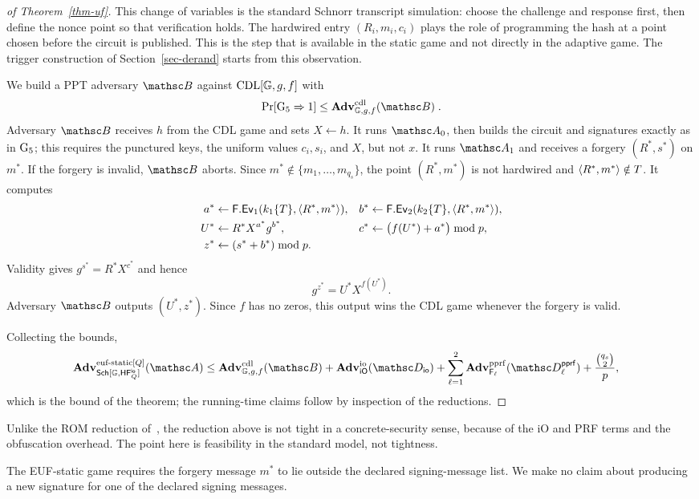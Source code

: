\begin{proof}[of Theorem~\ref{thm-uf}]
This change of variables is the standard Schnorr transcript simulation: choose the challenge and response first, then define the nonce point so that verification holds. The hardwired entry $(R_i,m_i,c_i)$ plays the role of programming the hash at a point chosen before the circuit is published. This is the step that is available in the static game and not directly in the adaptive game. The trigger construction of Section~\ref{sec-derand} starts from this observation.

 We build a PPT adversary $\advB$ against $\text{CDL}[\mathbb{G},g,f]$ with
$$\Pr[\Gm_5 \Rightarrow 1] \le \AdvCDL{\GG,g,f}{\advB} \;.$$
Adversary $\advB$ receives $h$ from the CDL game and sets $X\gets h$. It runs $\advA_0$, then builds the circuit and signatures exactly as in $\textnormal{G}_5$; this requires the punctured keys, the uniform values $c_i,s_i$, and $X$, but not $x$. It runs $\advA_1$ and receives a forgery $(R^*,s^*)$ on $m^*$. If the forgery is invalid, $\advB$ aborts. Since $m^*\notin\{m_1,\ldots,m_{q_s}\}$, the point $(R^*,m^*)$ is not hardwired and $\langle R^*,m^* \rangle\notin T$. It computes
$$
\begin{aligned}
a^*&\gets\mathsf{F}.\mathsf{Ev}_1(k_1\{T\},\langle R^*,m^* \rangle),
&b^*&\gets\mathsf{F}.\mathsf{Ev}_2(k_2\{T\},\langle R^*,m^* \rangle),\\
U^*&\gets R^*X^{a^*}g^{b^*},
&c^*&\gets\bigl(f(U^*)+a^*\bigr)\bmod p,\\
z^*&\gets(s^*+b^*)\bmod p.
\end{aligned}
$$
Validity gives $g^{s^*}=R^*X^{c^*}$ and hence
$$
g^{z^*}=U^*X^{f(U^*)}.
$$
Adversary $\advB$ outputs $(U^*,z^*)$. Since $f$ has no zeros, this output wins the CDL game whenever the forgery is valid.

 Collecting the bounds,
\begin{align*}
\AdvEUFSTATICQ{\SchScheme[\GG, \HF^{\mathsf{io}}_Q]}{\advA}
\le{}& \AdvCDL{\GG,g,f}{\advB}
+ \AdvIO{\iO}{\advD_{\mathsf{io}}}
+ \sum_{\ell=1}^{2}\AdvPPRF{\PRF_\ell}{\advD^{\mathsf{pprf}}_\ell}
+ \frac{\binom{q_s}{2}}{p},
\end{align*}
which is the bound of the theorem; the running-time claims follow by inspection of the reductions.
\end{proof}

\begin{remark} \label{rem-tight}
Unlike the ROM reduction of~\cite{C:CFOS25}, the reduction above is not tight in a concrete-security sense, because of the iO and PRF terms and the obfuscation overhead. The point here is feasibility in the standard model, not tightness.
\end{remark}

\begin{remark} \label{rem-strong}
The EUF-static game requires the forgery message $m^*$ to lie outside the declared signing-message list. We make no claim about producing a new signature for one of the declared signing messages.
\end{remark}
